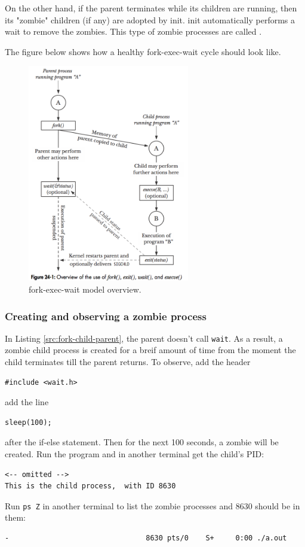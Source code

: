 \documentclass[a4paper]{article}
\begin{document}
On the other hand, if the parent terminates while its children are running, then its "zombie" children (if any) are adopted by init. init automatically performs a wait to remove the zombies. This type of zombie processes are called .

The figure below shows how a healthy fork-exec-wait cycle should look like.
\begin{figure}[H]
    \centering
    \includegraphics[height=9.5cm]{img/fork-exec-wait cycle.png}
    \caption{fork-exec-wait model overview.}
\end{figure}



\subsubsection{Creating and observing a zombie process}

In Listing \ref{src:fork-child-parent}, the parent doesn't call \texttt{wait}. As a result, a zombie child process is created for a breif amount of time from the moment the child terminates till the parent returns. To observe, add the header
\begin{verbatim}
#include <wait.h>
\end{verbatim}
add the line
\begin{verbatim}
sleep(100);
\end{verbatim}
after the if-else statement. Then for the next 100 seconds, a zombie will be created. Run the program and in another terminal get the child's PID:
\begin{verbatim}
<-- omitted -->
This is the child process,  with ID 8630
\end{verbatim}
Run \texttt{ps Z} in another terminal to list the zombie processes and 8630 should be in them:
\begin{verbatim}
-                                8630 pts/0    S+     0:00 ./a.out
\end{verbatim}
\end{document}
